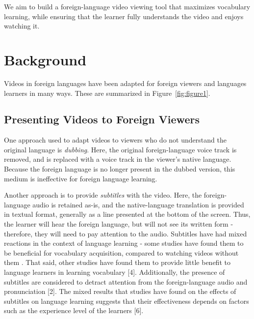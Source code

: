 \documentclass{sigchi}
\begin{document}
We aim to build a foreign-language video viewing tool
that maximizes vocabulary learning, while ensuring that the learner
fully understands the video and enjoys watching it.

\section{Background}

Videos in foreign languages have been adapted for foreign viewers and languages learners in many ways. These are summarized in Figure~\ref{fig:figure1}.



\subsection{Presenting Videos to Foreign Viewers}

One approach used to adapt videos to viewers who do not understand the original language is \emph{dubbing}. Here, the original foreign-language voice track is removed, and is replaced with a voice track in the viewer's native language.
Because the foreign language is no longer present in the dubbed version, this medium is ineffective for foreign language learning.

Another approach is to provide \emph{subtitles} with the video. Here, the foreign-language audio is retained as-is, and the native-language translation is provided in textual format, generally as a line presented at the bottom of the screen.
Thus, the learner will hear the foreign language, but will not see its written form - therefore, they will need to pay attention to the audio.
Subtitles have had mixed reactions in the context of language learning - some studies have found them to be beneficial for vocabulary acquisition, compared to watching videos without them \cite{danan2004captioning}.
That said, other studies have found them to provide little benefit to language learners in learning vocabulary [4]. Additionally, the presence of subtitles are considered to detract attention from the foreign-language audio and pronunciation [2].
The mixed results that studies have found on the effects of subtitles on language learning suggests that their effectiveness depends on factors such as the experience level of the learners [6].
\end{document}
